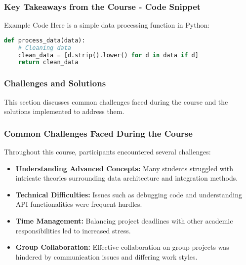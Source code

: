 \documentclass[aspectratio=169]{beamer}
\begin{document}
\begin{frame}[fragile]
    \frametitle{Key Takeaways from the Course - Code Snippet}
    \begin{block}{Example Code}
    Here is a simple data processing function in Python:
    \end{block}
    
    \begin{lstlisting}[language=Python]
def process_data(data):
    # Cleaning data
    clean_data = [d.strip().lower() for d in data if d]
    return clean_data
    \end{lstlisting}
\end{frame}

\begin{frame}
    \frametitle{Challenges and Solutions}
    This section discusses common challenges faced during the course and the solutions implemented to address them.
\end{frame}

\begin{frame}
    \frametitle{Common Challenges Faced During the Course}
    Throughout this course, participants encountered several challenges:
    
    \begin{itemize}
        \item \textbf{Understanding Advanced Concepts:} Many students struggled with intricate theories surrounding data architecture and integration methods.
        \item \textbf{Technical Difficulties:} Issues such as debugging code and understanding API functionalities were frequent hurdles.
        \item \textbf{Time Management:} Balancing project deadlines with other academic responsibilities led to increased stress.
        \item \textbf{Group Collaboration:} Effective collaboration on group projects was hindered by communication issues and differing work styles.
    \end{itemize}
\end{frame}
\end{document}
